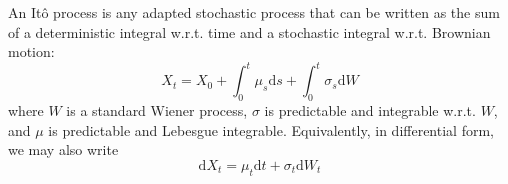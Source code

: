 \begin{definition}[It\^{o} Processes]
    An It\^{o} process is any adapted stochastic process that can be written as the sum of a 
    deterministic integral w.r.t. time and a stochastic integral w.r.t. Brownian motion:
    \begin{equation}
        X_t=X_0+\int_0^t\mu_s\mathrm ds+\int_0^t\sigma_s\mathrm dW
    \end{equation}
    where $W$ is a standard Wiener process, $\sigma$ is predictable and integrable w.r.t. $W$,
    and $\mu$ is predictable and Lebesgue integrable. Equivalently, in differential form, we 
    may also write
    \begin{equation}
        \mathrm dX_t=\mu_t\mathrm dt + \sigma_t\mathrm dW_t
    \end{equation}
\end{definition}

